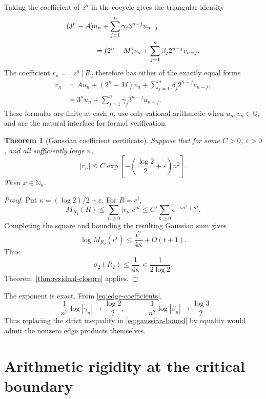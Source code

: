 \documentclass[11pt]{article}
\newtheorem{theorem}{Theorem}[section]
\theoremstyle{definition}
\newcommand{\Q}{\mathbb Q}
\newcommand{\Nzero}{\mathbb N_0}
\begin{document}
Taking the coefficient of \(z^n\) in the cocycle gives the triangular identity
\begin{align}
 &(3^n-A)u_n
   +\sum_{j=1}^n\gamma_j3^{n-j}u_{n-j}
 \notag\\
 &\hspace{4em}=(2^n-M)v_n
   +\sum_{j=1}^n\beta_j2^{n-j}v_{n-j}.
 \label{eq:coefficient-cocycle}
\end{align}
The coefficient \(r_n=[z^n]R_2\) therefore has either of the exactly equal forms
\begin{align}
 r_n
  &=A u_n+(2^n-M)v_n
    +\sum_{j=1}^n\beta_j2^{n-j}v_{n-j},
    \label{eq:r-coeff-v}\\
  &=3^n u_n+\sum_{j=1}^n\gamma_j3^{n-j}u_{n-j}.
    \label{eq:r-coeff-u}
\end{align}
These formulas are finite at each \(n\), use only rational arithmetic when \(u_n,v_n\in\Q\), and are the natural interface for formal verification.

\begin{theorem}[Gaussian coefficient certificate]\label{thm:gaussian-certificate}
Suppose that for some \(C>0\), \(\varepsilon>0\), and all sufficiently large \(n\),
\begin{equation}\label{eq:gaussian-bound}
  |r_n|\le C\exp\left[-\left(\frac{\log2}{2}+\varepsilon\right)n^2\right].
\end{equation}
Then \(x\in\Nzero\).
\end{theorem}

\begin{proof}
Put \(\kappa=(\log2)/2+\varepsilon\).  For \(R=e^t\),
\[
  M_{R_2}(R)
  \le \sum_{n\ge0}|r_n|e^{nt}
  \le C'\sum_{n\ge0}e^{-\kappa n^2+nt}.
\]
Completing the square and bounding the resulting Gaussian sum gives
\[
  \log M_{R_2}(e^t)\le\frac{t^2}{4\kappa}+O(t+1).
\]
Thus
\[
  \sigma_2(R_2)\le\frac1{4\kappa}<\frac1{2\log2}.
\]
Theorem~\ref{thm:residual-closure} applies.
\end{proof}

The exponent is exact.  From \eqref{eq:edge-coefficients},
\begin{equation}\label{eq:edge-gaussian-sharpness}
  -\frac1{n^2}\log|\gamma_n|\longrightarrow\frac{\log2}{2},
  \qquad
  -\frac1{n^2}\log|\beta_n|\longrightarrow\frac{\log3}{2}.
\end{equation}
Thus replacing the strict inequality in \eqref{eq:gaussian-bound} by equality would admit the nonzero edge products themselves.

\section{Arithmetic rigidity at the critical boundary}\label{sec:arithmetic}
\end{document}
